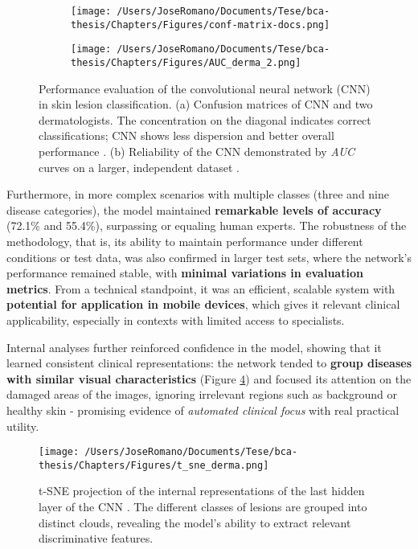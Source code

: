 \begin{figure}[htbp]
  \centering
  \begin{subfigure}[b]{0.45\textwidth}
    \centering
    \texttt{[image: /Users/JoseRomano/Documents/Tese/bca-thesis/Chapters/Figures/conf-matrix-docs.png]}
    \label{fig:conf-matrix-docs}
  \end{subfigure}
  \hfill
  \begin{subfigure}[b]{0.45\textwidth}
    \centering
    \texttt{[image: /Users/JoseRomano/Documents/Tese/bca-thesis/Chapters/Figures/AUC\_derma\_2.png]}
    \label{fig:AUC_dnn_model}
  \end{subfigure}
  \caption{Performance evaluation of the convolutional neural network (CNN) in skin lesion classification. (a) Confusion matrices of CNN and two dermatologists. The concentration on the diagonal indicates correct classifications; CNN shows less dispersion and better overall performance \cite{ai_in_dermacancer_esteva2017}. (b) Reliability of the CNN demonstrated by \textit{AUC} curves on a larger, independent dataset \cite{ai_in_dermacancer_esteva2017}.}
  \label{fig:AUC_derma_total}
\end{figure}

Furthermore, in more complex scenarios with multiple classes (three and nine
disease categories), the model maintained \textbf{remarkable levels of
  accuracy} (72.1\% and 55.4\%), surpassing or equaling human experts. The
robustness of the methodology, that is, its ability to maintain performance
under different conditions or test data, was also confirmed in larger test
sets, where the network's performance remained stable, with \textbf{minimal
  variations in evaluation metrics}. From a technical standpoint, it was an
efficient, scalable system with \textbf{potential for application in mobile
  devices}, which gives it relevant clinical applicability, especially in
contexts with limited access to specialists.

Internal analyses further reinforced confidence in the model, showing that it
learned consistent clinical representations: the network tended to
\textbf{group diseases with similar visual characteristics} (Figure
\ref{fig:tsne_derma}) and focused its attention on the damaged areas of the
images, ignoring irrelevant regions such as background or healthy skin -
promising evidence of \textit{automated clinical focus} with real practical
utility.

\begin{figure} [h]
  \centering
  \texttt{[image: /Users/JoseRomano/Documents/Tese/bca-thesis/Chapters/Figures/t\_sne\_derma.png]}
  \caption{t-SNE projection of the internal representations of the last hidden layer of the CNN \cite{ai_in_dermacancer_esteva2017}. The different classes of lesions are grouped into distinct clouds, revealing the model's ability to extract relevant discriminative features.}
  \label{fig:tsne_derma}
\end{figure}

